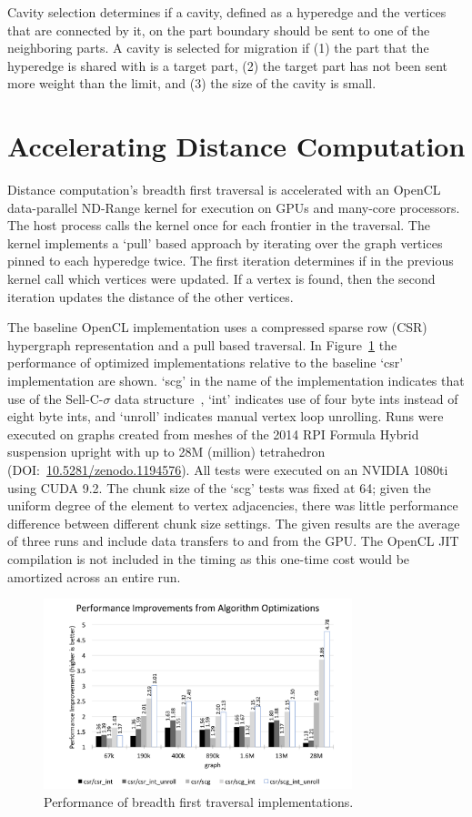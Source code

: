 \documentclass[graybox]{svmult}
\begin{document}
Cavity selection determines if a cavity, defined as a hyperedge and the vertices
that are connected by it, on the part boundary should be sent to one of the
neighboring parts.
A cavity is selected for migration if (1) the part that the hyperedge is shared
with is a target part, (2) the target part has not been sent more weight than
the limit, and (3) the size of the cavity is small.

\section{Accelerating Distance Computation} \label{sec:dist}

Distance computation's breadth first traversal is accelerated with an OpenCL
data-parallel ND-Range kernel for execution on GPUs and many-core processors.
The host process calls the kernel once for each frontier in the traversal.
The kernel implements a `pull' based approach by iterating over the graph
vertices pinned to each hyperedge twice.
The first iteration determines if in the previous kernel call which vertices were
updated.
If a vertex is found, then the second iteration updates the distance of the other
vertices.

The baseline OpenCL implementation uses a compressed sparse row (CSR)
hypergraph representation and a pull based traversal.
In Figure~\ref{fig:bfs} the performance of optimized implementations
relative to the baseline `csr' implementation are shown.
`scg' in the name of the implementation indicates that use of the
Sell-C-$\sigma$ data structure~\cite{sellCSigma}, `int' indicates use of four
byte ints instead of eight byte ints, and `unroll' indicates manual vertex loop
unrolling.
Runs were executed on graphs created from meshes of the 2014 RPI
Formula Hybrid suspension upright with up to 28M (million) tetrahedron
(DOI:~\url{10.5281/zenodo.1194576}).
All tests were executed on an NVIDIA 1080ti using CUDA 9.2.
The chunk size of the `scg' tests was fixed at 64; given the uniform degree of
the element to vertex adjacencies, there was little performance
difference between different chunk size settings.
The given results are the average of three runs and include data transfers to
and from the GPU.
The OpenCL JIT compilation is not included in the timing as this one-time
cost would be amortized across an entire run.

\begin{figure}
  \centering
  \label{fig:bfs}
  \includegraphics[width=0.8\textwidth]{images/bfsPerformance.png}
  \caption{
    Performance of breadth first traversal implementations.
  }
\end{figure}
\end{document}
